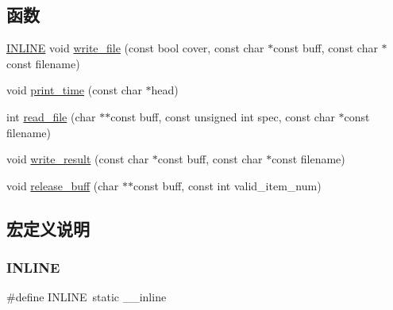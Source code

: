 \subsection*{函数}
\begin{DoxyCompactItemize}
\item 
\hyperlink{_s_d_k-gcc_2cdn_2io_8cpp_a2eb6f9e0395b47b8d5e3eeae4fe0c116}{I\+N\+L\+I\+NE} void \hyperlink{_s_d_k-gcc_2cdn_2io_8cpp_afe2b242b1d443785861b52450c69b3ba}{write\+\_\+file} (const bool cover, const char $\ast$const buff, const char $\ast$const filename)
\item 
void \hyperlink{_s_d_k-gcc_2cdn_2io_8cpp_aaf1025c02a814d50eebe605851e71900}{print\+\_\+time} (const char $\ast$head)
\item 
int \hyperlink{_s_d_k-gcc_2cdn_2io_8cpp_a708ad21ddaefbe61c2eb2ccfa830fc27}{read\+\_\+file} (char $\ast$$\ast$const buff, const unsigned int spec, const char $\ast$const filename)
\item 
void \hyperlink{_s_d_k-gcc_2cdn_2io_8cpp_a25431423c5cb8a43c0119c62e4e120cb}{write\+\_\+result} (const char $\ast$const buff, const char $\ast$const filename)
\item 
void \hyperlink{_s_d_k-gcc_2cdn_2io_8cpp_adc4a454a96742f1b3dae623d8ed4c288}{release\+\_\+buff} (char $\ast$$\ast$const buff, const int valid\+\_\+item\+\_\+num)
\end{DoxyCompactItemize}


\subsection{宏定义说明}
\mbox{\label{_s_d_k-gcc_2cdn_2io_8cpp_a2eb6f9e0395b47b8d5e3eeae4fe0c116}} 
\subsubsection{\texorpdfstring{I\+N\+L\+I\+NE}{INLINE}}
{\footnotesize\ttfamily \#define I\+N\+L\+I\+NE~static \+\_\+\+\_\+inline}

\mbox{\label{_s_d_k-gcc_2cdn_2io_8cpp_a09a3b394b8602092d58347b791158062}} 
